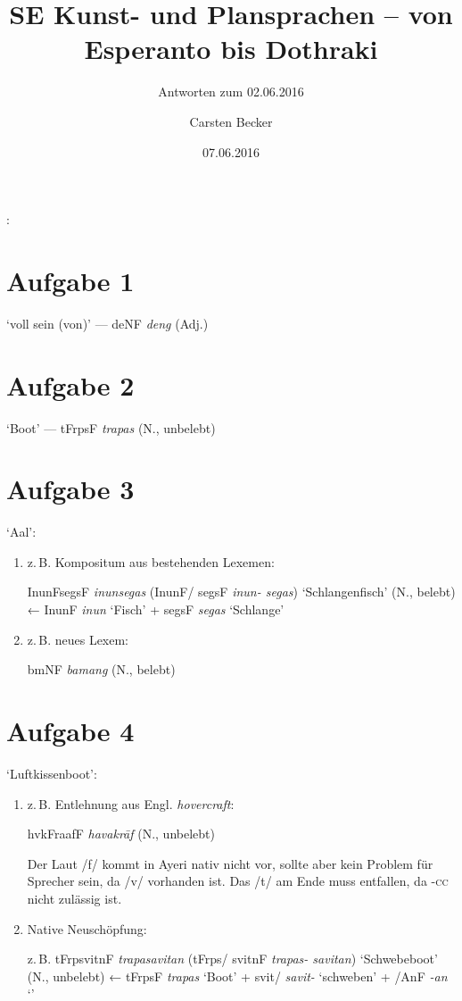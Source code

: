 \documentclass[12pt,paper=a4]{scrartcl}
\author{Carsten Becker}
\title{SE Kunst- und Plansprachen -- von Esperanto bis Dothraki}
\subtitle{Antworten zum 02.06.2016}
\date{07.06.2016} %
\newcommand{\ayr}[1]{{\Tagati #1}}
\newcommand{\xayr}[3]{{\Tagati #1} \emph{#2} `#3'}
\newenvironment{mytitle}{
    \hfill
    \begin{minipage}{0.667\textwidth}
	\vspace{\baselineskip}
	\begin{center}
	    \Large
	    \sffamily\bfseries
	    \makeatletter
}{
	    \makeatother
	\end{center}
	\vspace{1em}
    \end{minipage}
    \hfill
}
\begin{document}

\begin{mytitle}
    \@title: \@subtitle\footnotemark
\end{mytitle}

\section{Aufgabe 1}
`voll sein (von)' --- \ayr{deNF} \textit{deng} (Adj.)

\section{Aufgabe 2}
`Boot' --- \ayr{tFrpsF} \textit{trapas} (N., unbelebt)

\section{Aufgabe 3}
`Aal':

\begin{enumerate}[label={(\alph*)}]
	\item z.\,B. Kompositum aus bestehenden Lexemen:
	
		\ayr{InunFsegsF} \textit{inunsegas} (\ayr{InunF/ segsF} 
		\textit{inun- segas}) `Schlangenfisch' (N., belebt) ← 
		\xayr{InunF}{inun}{Fisch} + \xayr{segsF}{segas}{Schlange}

	\item z.\,B. neues Lexem:
	
		\ayr{bmNF} \textit{bamang} (N., belebt)
		
\end{enumerate}

\section{Aufgabe 4}
`Luftkissenboot':

\begin{enumerate}[label={(\alph*)}]
	
	\item z.\,B. Entlehnung aus Engl. \textit{hovercraft}:
	
		\ayr{hvkFraafF} \textit{havakrāf} (N., unbelebt)
		
		Der Laut /f/ kommt in Ayeri nativ nicht vor, sollte aber kein 
		Problem für Sprecher sein, da /v/ vorhanden ist. Das /t/ am Ende 
		muss entfallen, da \textsc{-cc} nicht zulässig ist.
		
		\item Native Neuschöpfung:
		
		z.\,B. \ayr{tFrpsvitnF} \textit{trapasavitan} 
		(\ayr{tFrps/ svitnF} \textit{trapas- savitan})
		`Schwebeboot' (N., unbelebt) ← \xayr{tFrpsF}{trapas}{Boot} + 
		\xayr{svit/}{savit-}{schweben} + \xayr{/AnF}{-an}{\Nmlz{}}
		
	\end{enumerate}
\end{document}
